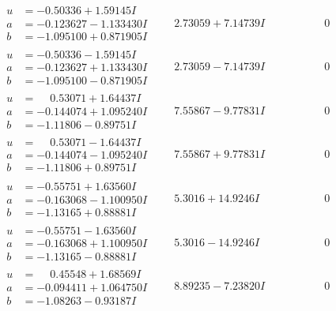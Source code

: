 \documentclass[1p]{elsarticle_modified}
\theoremstyle{definition}
\begin{document}
$$\begin{array}{c|c|c}
\begin{aligned}
u &= -0.50336 + 1.59145 I \\
a &= -0.123627 - 1.133430 I \\
b &= -1.095100 + 0.871905 I\end{aligned}
 & \phantom{-}2.73059 + 7.14739 I & \phantom{-0.000000 } 0 \\ \hline\begin{aligned}
u &= -0.50336 - 1.59145 I \\
a &= -0.123627 + 1.133430 I \\
b &= -1.095100 - 0.871905 I\end{aligned}
 & \phantom{-}2.73059 - 7.14739 I & \phantom{-0.000000 } 0 \\ \hline\begin{aligned}
u &= \phantom{-}0.53071 + 1.64437 I \\
a &= -0.144074 + 1.095240 I \\
b &= -1.11806 - 0.89751 I\end{aligned}
 & \phantom{-}7.55867 - 9.77831 I & \phantom{-0.000000 } 0 \\ \hline\begin{aligned}
u &= \phantom{-}0.53071 - 1.64437 I \\
a &= -0.144074 - 1.095240 I \\
b &= -1.11806 + 0.89751 I\end{aligned}
 & \phantom{-}7.55867 + 9.77831 I & \phantom{-0.000000 } 0 \\ \hline\begin{aligned}
u &= -0.55751 + 1.63560 I \\
a &= -0.163068 - 1.100950 I \\
b &= -1.13165 + 0.88881 I\end{aligned}
 & \phantom{-}5.3016 + 14.9246 I & \phantom{-0.000000 } 0 \\ \hline\begin{aligned}
u &= -0.55751 - 1.63560 I \\
a &= -0.163068 + 1.100950 I \\
b &= -1.13165 - 0.88881 I\end{aligned}
 & \phantom{-}5.3016 - 14.9246 I & \phantom{-0.000000 } 0 \\ \hline\begin{aligned}
u &= \phantom{-}0.45548 + 1.68569 I \\
a &= -0.094411 + 1.064750 I \\
b &= -1.08263 - 0.93187 I\end{aligned}
 & \phantom{-}8.89235 - 7.23820 I & \phantom{-0.000000 } 0 \\ \hline\begin{aligned}

\end{aligned}
\end{array}$$
\end{document}
